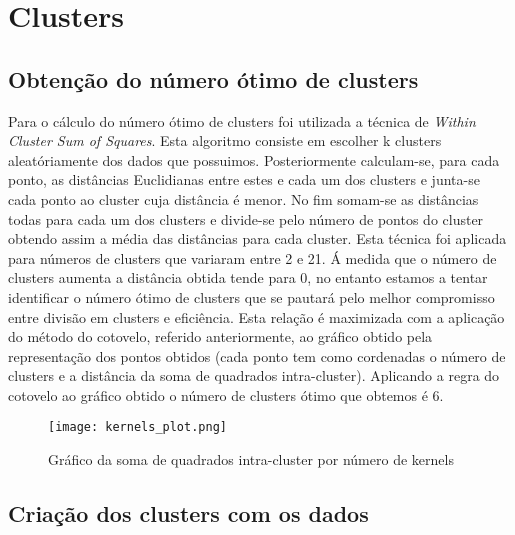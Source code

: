 \section{Clusters}

\subsection{Obtenção do número ótimo de clusters}

Para o cálculo do número ótimo de clusters foi utilizada a técnica de \textit{Within Cluster Sum of Squares}. 
Esta algoritmo consiste em escolher k clusters aleatóriamente dos dados que possuimos. Posteriormente calculam-se, para cada ponto, as distâncias Euclidianas entre estes e cada um dos clusters e junta-se cada ponto ao cluster cuja distância é menor.\newline
No fim somam-se as distâncias todas para cada um dos clusters e divide-se pelo número de pontos do cluster obtendo assim a média das distâncias para cada cluster.\newline
Esta técnica foi aplicada para números de clusters que variaram entre 2 e 21. Á medida que o número de clusters aumenta a distância obtida tende para 0, no entanto estamos a tentar identificar o número ótimo de clusters que se pautará pelo melhor compromisso entre divisão em clusters e eficiência. Esta relação é maximizada com a aplicação do método do cotovelo, referido anteriormente, ao gráfico obtido pela representação dos pontos obtidos (cada ponto tem como cordenadas o número de clusters e a distância da soma de quadrados intra-cluster). Aplicando a regra do cotovelo ao gráfico obtido o número de clusters ótimo que obtemos é 6.

\begin{figure}[h]
 
	\centering
 	\texttt{[image: kernels\_plot.png]} 
	\caption{Gráfico da soma de quadrados intra-cluster por número de kernels}
\end{figure}



\subsection{Criação dos clusters com os dados}


